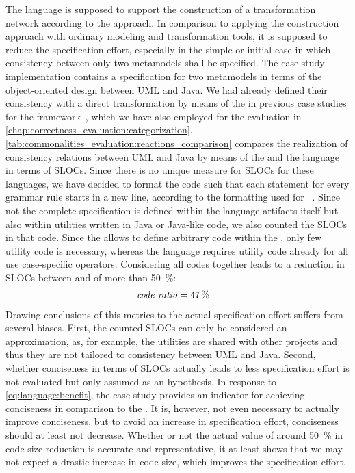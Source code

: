 The \commonalities language is supposed to support the construction of a transformation network according to the \commonalities approach.
In comparison to applying the construction approach with ordinary modeling and transformation tools, it is supposed to reduce the specification effort, especially in the simple or initial case in which consistency between only two metamodels shall be specified.
The case study implementation contains a specification for two metamodels in terms of the object-oriented design \commonalities between \gls{UML} and Java.
We had already defined their consistency with a direct transformation by means of the \reactionslanguage in previous case studies for the \vitruv framework~, which we have also employed for the evaluation in \autoref{chap:correctness_evaluation:categorization}.
\autoref{tab:commonalities_evaluation:reactions_comparison} compares the realization of consistency relations between \gls{UML} and Java by means of the \reactionslanguage and the \commonalities language in terms of \glspl{SLOC}.
Since there is no unique measure for \glspl{SLOC} for these languages, we have decided to format the code such that each statement for every grammar rule starts in a new line, according to the formatting used for \reactions~.
Since not the complete specification is defined within the language artifacts itself but also within utilities written in Java or Java-like code, we also counted the \glspl{SLOC} in that code.
Since the \reactionslanguage allows to define arbitrary code within the \reactions, only few utility code is necessary, whereas the \commonalities language requires utility code already for all use case-specific operators.
Considering all codes together leads to a reduction in \glspl{SLOC} between \reactions and \commonalities of more than \SI{50}{\percent}:
\begin{align*}
    &
    \mathit{code\ ratio} = \SI{47}{\percent}
\end{align*}
Drawing conclusions of this metrics to the actual specification effort suffers from several biases.
First, the counted \glspl{SLOC} can only be considered an approximation, as, for example, the utilities are shared with other projects and thus they are not tailored to consistency between \gls{UML} and Java.
Second, whether conciseness in terms of \glspl{SLOC} actually leads to less specification effort is not evaluated but only assumed as an hypothesis.
In response to \autoref{eq:language:benefit}, the case study provides an indicator for achieving conciseness in comparison to the \reactionslanguage.
It is, however, not even necessary to actually improve conciseness, but to avoid an increase in specification effort, conciseness should at least not decrease.
Whether or not the actual value of around \SI{50}{\percent} in code size reduction is accurate and representative, it at least shows that we may not expect a drastic increase in code size, which improves the specification effort.



